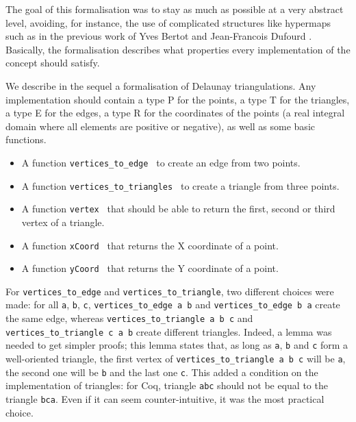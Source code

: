\documentclass[a4paper,10pt]{article}
\def\ttt#1#2{{\tt{\color{black}#1} #2}}
\begin{document}
The goal of this formalisation was to stay as much as possible at a very abstract level, avoiding, for instance, the use of complicated structures like hypermaps such as in the previous work of Yves Bertot and Jean-Francois Dufourd \cite{Bertot}. Basically, the formalisation describes what properties every implementation of the concept should satisfy.

We describe in the sequel a formalisation of Delaunay triangulations. Any implementation should contain a type P for the points, a type T for the triangles, a type E for the edges, a type R for the coordinates of the points (a real integral domain where all elements are positive or negative), as well as some basic functions.
\begin{itemize}
\item A function \ttt{vertices\_to\_edge}{} to create an edge from two points.
\item A function \ttt{vertices\_to\_triangles}{} to create a triangle from three points.
\item A function \ttt{vertex}{}  that should be able to return the first, second or third vertex of a triangle.
\item A function \ttt{xCoord}{} that returns the X coordinate of a point.
\item A function \ttt{yCoord}{} that returns the Y coordinate of a point.
\end{itemize}

For {\tt vertices\_to\_edge} and {\tt vertices\_to\_triangle}, two different choices were made:
for all {\tt a}, {\tt b}, {\tt c}, {\tt vertices\_to\_edge a b} and {\tt vertices\_to\_edge b a} create the same edge, whereas {\tt vertices\_to\_triangle a b c} and {\tt vertices\_to\_triangle c a b} create different triangles. Indeed, a lemma was needed to get simpler proofs; this lemma states that, as long as {\tt a}, {\tt b} and {\tt c} form a well-oriented triangle, the first vertex of {\tt vertices\_to\_triangle a b c} will be {\tt a}, the second one will be {\tt b} and the last one {\tt c}. This added a condition on the implementation of triangles: for {\sc Coq}, triangle {\tt abc} should not be equal to the triangle {\tt bca}. Even if it can seem counter-intuitive, it was the most practical choice. 
\end{document}
